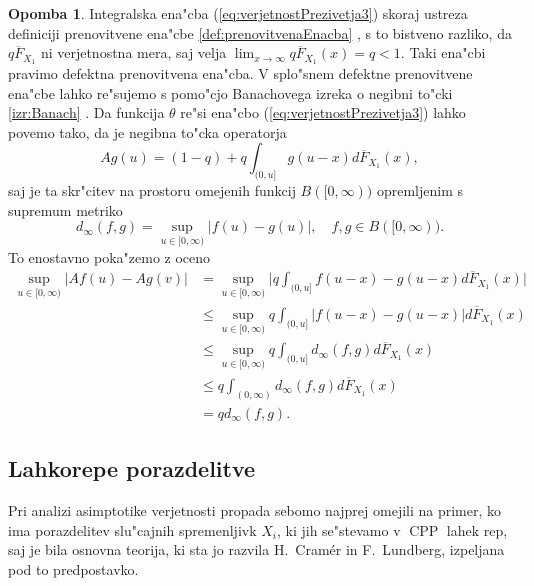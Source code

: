 \documentclass[12pt, a4paper, reqno]{amsart}
\theoremstyle{definition}
\newtheorem{opomba}[definicija]{Opomba}
\theoremstyle{plain}
\newcommand{\1}{\mathds{1}}
\DeclareMathOperator{\CPP}{CPP}
\newcommand*{\refPriloga}[1]{%
  \begingroup
    \hypersetup{
      linkcolor=red,
      linkbordercolor=red,
    }%
    \ref{#1}%
  \endgroup
}
\begin{document}
    \begin{opomba}
    Integralska ena"cba (\ref{eq:verjetnostPrezivetja3}) skoraj ustreza definiciji prenovitvene ena"cbe
    \refPriloga{def:prenovitvenaEnacba}, s 
    to bistveno razliko, da $q\overline{F}_{X_1}$ ni verjetnostna mera, saj velja 
    $\lim_{x\to\infty}q\overline{F}_{X_1}(x) = q < 1$. Taki ena"cbi pravimo
    defektna prenovitvena ena"cba. V splo"snem defektne prenovitvene ena"cbe lahko re"sujemo s pomo"cjo 
    Banachovega izreka o negibni to"cki \refPriloga{izr:Banach}. Da funkcija $\theta$ re"si ena"cbo 
    (\ref{eq:verjetnostPrezivetja3}) lahko povemo tako, da je negibna to"cka operatorja 
    \begin{equation}
        Ag(u) = (1 - q) + q\int_{(0, u]}g(u - x)d\overline{F}_{X_1}(x),
        \label{eq:operator}
    \end{equation}
    saj je ta skr"citev na prostoru omejenih funkcij $B([0, \infty))$ opremljenim s supremum metriko
    \begin{equation*}
        d_\infty(f, g) = \sup_{u\in[0, \infty)}\big|f(u) - g(u)\big|,  \quad f, g\in B([0, \infty)).
    \end{equation*}
    To enostavno poka"zemo z oceno
    \begin{align*}
        \sup_{u\in[0, \infty)}\big|Af(u) - Ag(v)\big| 
                    &= \sup_{u\in[0, \infty)}\bigg|q\int_{(0, u]}f(u- x) - g(u - x)d\overline{F}_{X_1}(x)\bigg| \\
                                &\leq \sup_{u\in[0, \infty)}q\int_{(0, u]}\big|f(u - x) - g(u - x)\big|d\overline{F}_{X_1}(x) \\
                                &\leq \sup_{u\in[0, \infty)}q\int_{(0, u]}d_\infty(f, g)d\overline{F}_{X_1}(x) \\
                                &\leq q\int_{(0, \infty)}d_\infty(f, g)d\overline{F}_{X_1}(x)\\
                                &= qd_\infty(f, g).
    \end{align*}
    \label{op:OperatorPrenovitvena}
    \end{opomba}

    
    \subsection{Lahkorepe porazdelitve}
        Pri analizi asimptotike verjetnosti propada se\newline bomo najprej omejili na primer, ko ima 
        porazdelitev slu"cajnih spremenljivk $X_i$, ki jih 
        se"stevamo v $\CPP$ lahek rep, saj je bila osnovna teorija, ki sta jo razvila H.\ Cramér in F.\ Lundberg,
        izpeljana pod to predpostavko.
\end{document}
